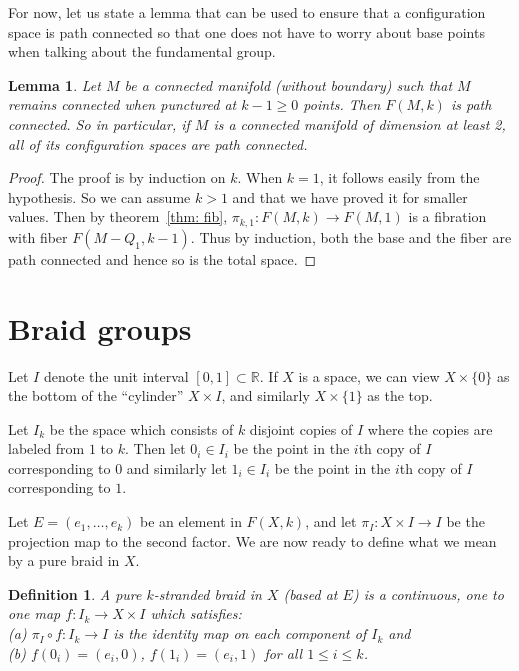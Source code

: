 \documentclass{amsart}
\newtheorem{lem}[thm]{Lemma}
\newtheorem{defn}[thm]{Definition}
\begin{document}
For now, let us state a lemma that can be used to ensure that a configuration
space is path connected so that one does not have to worry about base
points when talking about the fundamental group.

\begin{lem}
Let $M$ be a connected manifold (without boundary) such that $M$ remains
connected when punctured at $k-1 \geq 0$ points. Then $F(M,k)$ is
path connected. So in particular, if $M$ is a connected manifold
of dimension at least 2, all of its configuration spaces are path connected.
\end{lem}
\begin{proof}
The proof is by induction on $k$. When $k=1$, it follows easily from the
hypothesis. So we can assume $k>1$ and that we have proved it for smaller
values. Then by theorem~\ref{thm: fib}, 
$\pi_{k,1} : F(M,k) \rightarrow F(M,1)$ is a fibration with fiber
$F(M - Q_1, k-1)$. Thus by induction, both the base and the fiber are
path connected and hence so is the total space. 
\end{proof}



\section{Braid groups}

Let $I$ denote the unit interval $[0,1] \subset \mathbb{R}$.
If $X$ is a space, 
we can view $X \times \{0\}$ as the bottom of the ``cylinder'' $X \times I$,
and similarly $X \times \{1\}$ as the top.

Let $I_k$ be the space which consists of $k$ disjoint copies of $I$ where
the copies are labeled
from $1$ to $k$. Then 
let $0_i \in I_i$ be the point in the $i$th copy 
of $I$ corresponding to $0$ and similarly let $1_i \in I_i$ be the point in the
$i$th copy of $I$ corresponding to $1$.

Let $E=(e_1, \dots, e_k)$ be an element in $F(X,k)$, 
and let $\pi_I : X \times I
\rightarrow I$ be the projection map to the second factor. We are
now ready to define what we mean by a pure braid in $X$.

\begin{defn}
A pure $k$-stranded braid in $X$ (based at $E$) is a continuous, one to one
map $f: I_k \rightarrow X \times I$ which satisfies: \\
\noindent
(a) $\pi_I \circ f : I_k \rightarrow I$ is the identity map on each component
of $I_k$ and \\
\noindent
(b) $f(0_i)=(e_i,0)$, $f(1_i)=(e_i,1)$ for all $1 \leq i \leq k$.
\end{defn}
\end{document}
